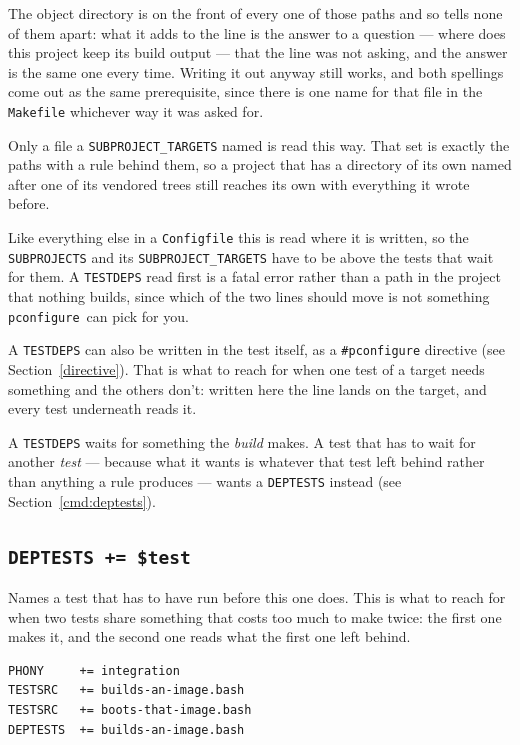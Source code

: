 \documentclass{article}
\newcommand{\pconfigure}{\texttt{pconfigure}}
\begin{document}
The object directory is on the front of every one of those paths and
so tells none of them apart: what it adds to the line is the answer
to a question --- where does this project keep its build output ---
that the line was not asking, and the answer is the same one every
time.  Writing it out anyway still works, and both spellings come out
as the same prerequisite, since there is one name for that file in
the \texttt{Makefile} whichever way it was asked for.

Only a file a \texttt{SUBPROJECT\_TARGETS} named is read this way.
That set is exactly the paths with a rule behind them, so a project
that has a directory of its own named after one of its vendored trees
still reaches its own with everything it wrote before.

Like everything else in a \texttt{Configfile} this is read where it
is written, so the \texttt{SUBPROJECTS} and its
\texttt{SUBPROJECT\_TARGETS} have to be above the tests that wait for
them.  A \texttt{TESTDEPS} read first is a fatal error rather than a
path in the project that nothing builds, since which of the two lines
should move is not something \pconfigure\ can pick for you.

A \texttt{TESTDEPS} can also be written in the test itself, as a
\texttt{\#pconfigure} directive (see Section~\ref{directive}).  That is
what to reach for when one test of a target needs something and the
others don't: written here the line lands on the target, and every
test underneath reads it.

A \texttt{TESTDEPS} waits for something the \textit{build} makes.  A
test that has to wait for another \textit{test} --- because what it
wants is whatever that test left behind rather than anything a rule
produces --- wants a \texttt{DEPTESTS} instead (see
Section~\ref{cmd:deptests}).

\subsection{\texttt{DEPTESTS += \$test} \label{cmd:deptests}}

Names a test that has to have run before this one does.  This is what
to reach for when two tests share something that costs too much to
make twice: the first one makes it, and the second one reads what the
first one left behind.

\begin{verbatim}
PHONY     += integration
TESTSRC   += builds-an-image.bash
TESTSRC   += boots-that-image.bash
DEPTESTS  += builds-an-image.bash
\end{verbatim}
\end{document}
